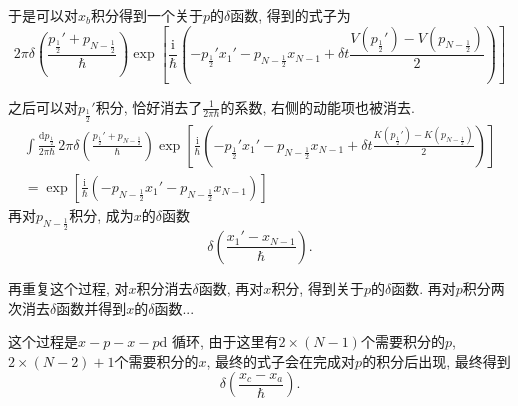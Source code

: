 \documentclass{ctexart}
\begin{document}
于是可以对$x_b$积分得到一个关于$p$的$\delta$函数, 得到的式子为
\begin{equation}
  2\pi \delta\left( \frac{p_{\frac{1}{2}}' + p_{N -\frac{1}{2}}}{\hbar} \right) \exp \left[ \frac{\mathrm{i} }{\hbar} \left( - p_{\frac{1}{2}}' x_1' - p_{N - \frac{1}{2}}x_{N-1} + \delta t \frac{V(p_{\frac{1}{2}}')-V(p_{N - \frac{1}{2}})}{2} \right)  \right] 
\end{equation}

之后可以对$p_{\frac{1}{2}}'$积分, 恰好消去了$\frac{1}{2\pi\hbar}$的系数, 右侧的动能项也被消去. 
\begin{gather}
  \int \frac{\mathrm{d} p_{\frac{1}{2}}}{2\pi \hbar} \, 2\pi \delta\left( \frac{p_{\frac{1}{2}}' + p_{N -\frac{1}{2}}}{\hbar} \right) \exp \left[ \frac{\mathrm{i} }{\hbar} \left( - p_{\frac{1}{2}}' x_1' - p_{N - \frac{1}{2}}x_{N-1} + \delta t \frac{K(p_{\frac{1}{2}}')-K(p_{N - \frac{1}{2}})}{2} \right)  \right] 
  \\
  = \exp \left[ \frac{\mathrm{i} }{\hbar} \left( - p_{N-\frac{1}{2}} x_1' - p_{N - \frac{1}{2}}x_{N-1}  \right)  \right] 
\end{gather}
再对$p_{N-\frac{1}{2}}$积分, 成为$x$的$\delta$函数
\begin{equation}
  \delta\left( \frac{x_1' - x_{N-1}}{\hbar} \right) .
\end{equation}

再重复这个过程, 对$x$积分消去$\delta$函数, 再对$x$积分, 得到关于$p$的$\delta$函数. 再对$p$积分两次消去$\delta$函数并得到$x$的$\delta$函数...

这个过程是$x-p-x-p$d 循环, 由于这里有$2\times (N-1)$个需要积分的$p$, $2\times (N-2) +1$个需要积分的$x$, 最终的式子会在完成对$p$的积分后出现,
最终得到
\begin{equation}
  \delta \left( \frac{x_c - x_a}{\hbar} \right) .
\end{equation}
\end{document}
